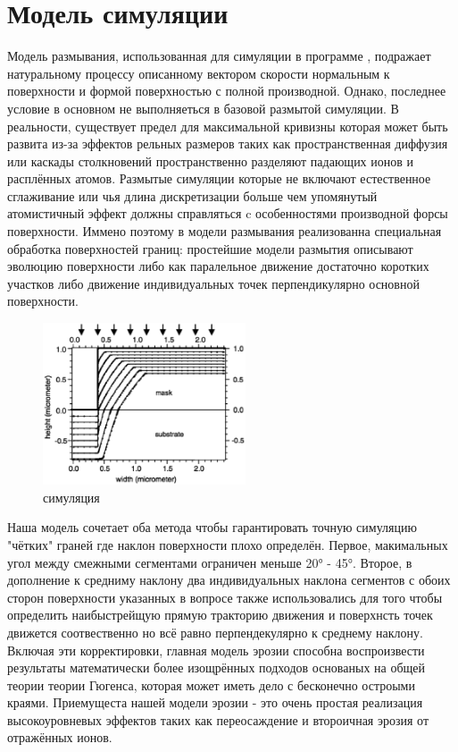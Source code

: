 \documentclass[a4paper,fontsize=12pt]{article}
\begin{document}
\section{Модель симуляции}

Модель размывания, использованная для симуляции в программе \ion{}, подражает натуральному процессу описанному вектором скорости нормальным к поверхности и формой поверхностью с полной производной. Однако, последнее условие в основном не выполняеться в базовой размытой симуляции. В реальности, существует предел для максимальной кривизны которая может быть развита из-за эффектов рельных размеров таких как пространственная диффузия или каскады столкновений пространственно разделяют падающих ионов и расплённых атомов. Размытые симуляции которые не включают естественное сглаживание или чья длина дискретизации больше чем упомянутый атомистичный эффект должны справляться c особенностями производной форсы поверхности. Иммено поэтому в модели размывания \ion{} реализованна специальная обработка поверхностей границ: простейшие модели размытия описывают эволюцию поверхности либо как паралельное движение достаточно коротких участков либо движение индивидуальных точек перпендикулярно основной поверхности.

\begin{figure}[h]
    \centering
    \includegraphics[width=6cm]{images/part2/1.eps}
    \caption{\ion симуляция}
    \label{fig:part2IonShaper}
\end{figure}

\newpage
Наша модель сочетает оба метода чтобы гарантировать точную симуляцию "чётких" граней где наклон поверхности плохо определён. Первое, макимальных угол между смежными сегментами ограничен меньше \ang{20} - \ang{45}. Второе, в дополнение к средниму наклону два индивидуальных наклона сегментов с обоих сторон поверхности указанных в вопросе также использовались для того чтобы определить наибыстрейщую прямую тракторию движения и поверхнсть точек движется соотвественно но всё равно перпендекулярно к среднему наклону. Включая эти корректировки, \ion{} главная модель эрозии способна воспроизвести результаты математически более изощрённых подходов основаных на общей теории теории Гюгенса, которая может иметь дело с бесконечно остроыми краями. Приемущеста нашей модели эрозии - это очень простая реализация высокоуровневых эффектов таких как переосаждение и второичная эрозия от отражённых ионов.
\end{document}
